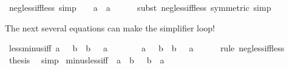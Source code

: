 \begin{isabellebody}
\isanewline
%
\endisadelimproof
\isanewline
{}\isamarkupfalse%
\ neg{\isacharunderscore}{\kern0pt}{}{\isacharunderscore}{\kern0pt}less{\isacharunderscore}{\kern0pt}iff{\isacharunderscore}{\kern0pt}less\ {\isacharbrackleft}{\kern0pt}simp{\isacharbrackright}{\kern0pt}{\isacharcolon}{\kern0pt}\ {\isachardoublequoteopen}{}\ {\isacharless}{\kern0pt}\ {\isacharminus}{\kern0pt}\ a\ {\isasymlongleftrightarrow}\ a\ {\isacharless}{\kern0pt}\ {}{\isachardoublequoteclose}\isanewline
%
\isadelimproof
\ \ %
\endisadelimproof
%
\isatagproof
{}\isamarkupfalse%
\ {\isacharparenleft}{\kern0pt}subst\ neg{\isacharunderscore}{\kern0pt}less{\isacharunderscore}{\kern0pt}iff{\isacharunderscore}{\kern0pt}less\ {\isacharbrackleft}{\kern0pt}symmetric{\isacharbrackright}{\kern0pt}{\isacharparenright}{\kern0pt}\ simp%
\endisatagproof
{\isafoldproof}%
%
\isadelimproof
%
\endisadelimproof
%
\begin{isamarkuptext}%
The next several equations can make the simplifier loop!%
\end{isamarkuptext}\isamarkuptrue%
\isamarkupfalse%
\ less{\isacharunderscore}{\kern0pt}minus{\isacharunderscore}{\kern0pt}iff{\isacharcolon}{\kern0pt}\ {\isachardoublequoteopen}a\ {\isacharless}{\kern0pt}\ {\isacharminus}{\kern0pt}\ b\ {\isasymlongleftrightarrow}\ b\ {\isacharless}{\kern0pt}\ {\isacharminus}{\kern0pt}\ a{\isachardoublequoteclose}\isanewline
%
\isadelimproof
%
\endisadelimproof
%
\isatagproof
{}\isamarkupfalse%
\ {\isacharminus}{\kern0pt}\isanewline
\ \ \isamarkupfalse%
\ {\isachardoublequoteopen}{\isacharminus}{\kern0pt}\ {\isacharparenleft}{\kern0pt}{\isacharminus}{\kern0pt}\ a{\isacharparenright}{\kern0pt}\ {\isacharless}{\kern0pt}\ {\isacharminus}{\kern0pt}\ b\ {\isasymlongleftrightarrow}\ b\ {\isacharless}{\kern0pt}\ {\isacharminus}{\kern0pt}\ a{\isachardoublequoteclose}\isanewline
\ \ \ \ \isamarkupfalse%
\ {\isacharparenleft}{\kern0pt}rule\ neg{\isacharunderscore}{\kern0pt}less{\isacharunderscore}{\kern0pt}iff{\isacharunderscore}{\kern0pt}less{\isacharparenright}{\kern0pt}\isanewline
\ \ \isamarkupfalse%
\ \isamarkupfalse%
\ {\isacharquery}{\kern0pt}thesis\ \isamarkupfalse%
\ simp\isanewline
{}\isamarkupfalse%
%
\endisatagproof
{\isafoldproof}%
%
\isadelimproof
\isanewline
%
\endisadelimproof
\isanewline
{}\isamarkupfalse%
\ minus{\isacharunderscore}{\kern0pt}less{\isacharunderscore}{\kern0pt}iff{\isacharcolon}{\kern0pt}\ {\isachardoublequoteopen}{\isacharminus}{\kern0pt}\ a\ {\isacharless}{\kern0pt}\ b\ {\isasymlongleftrightarrow}\ {\isacharminus}{\kern0pt}\ b\ {\isacharless}{\kern0pt}\ a{\isachardoublequoteclose}\isanewline

\end{isabellebody}
